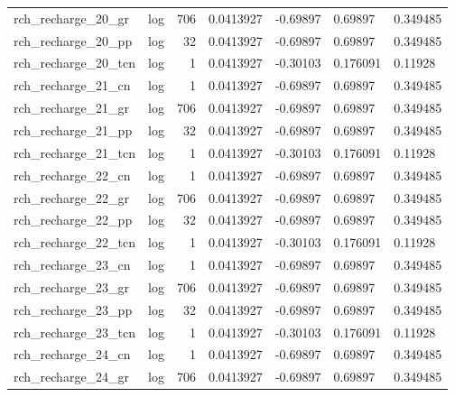 \documentclass{article}
\begin{document}
\begin{center}
\begin{landscape}
\begin{longtable}{llrllll}
 rch\_recharge\_20\_gr &       log &    706 &      0.0413927 &       -0.69897 &        0.69897 &           0.349485 \\
 rch\_recharge\_20\_pp &       log &     32 &      0.0413927 &       -0.69897 &        0.69897 &           0.349485 \\
rch\_recharge\_20\_tcn &       log &      1 &      0.0413927 &       -0.30103 &       0.176091 &            0.11928 \\
 rch\_recharge\_21\_cn &       log &      1 &      0.0413927 &       -0.69897 &        0.69897 &           0.349485 \\
 rch\_recharge\_21\_gr &       log &    706 &      0.0413927 &       -0.69897 &        0.69897 &           0.349485 \\
 rch\_recharge\_21\_pp &       log &     32 &      0.0413927 &       -0.69897 &        0.69897 &           0.349485 \\
rch\_recharge\_21\_tcn &       log &      1 &      0.0413927 &       -0.30103 &       0.176091 &            0.11928 \\
 rch\_recharge\_22\_cn &       log &      1 &      0.0413927 &       -0.69897 &        0.69897 &           0.349485 \\
 rch\_recharge\_22\_gr &       log &    706 &      0.0413927 &       -0.69897 &        0.69897 &           0.349485 \\
 rch\_recharge\_22\_pp &       log &     32 &      0.0413927 &       -0.69897 &        0.69897 &           0.349485 \\
rch\_recharge\_22\_tcn &       log &      1 &      0.0413927 &       -0.30103 &       0.176091 &            0.11928 \\
 rch\_recharge\_23\_cn &       log &      1 &      0.0413927 &       -0.69897 &        0.69897 &           0.349485 \\
 rch\_recharge\_23\_gr &       log &    706 &      0.0413927 &       -0.69897 &        0.69897 &           0.349485 \\
 rch\_recharge\_23\_pp &       log &     32 &      0.0413927 &       -0.69897 &        0.69897 &           0.349485 \\
rch\_recharge\_23\_tcn &       log &      1 &      0.0413927 &       -0.30103 &       0.176091 &            0.11928 \\
 rch\_recharge\_24\_cn &       log &      1 &      0.0413927 &       -0.69897 &        0.69897 &           0.349485 \\
 rch\_recharge\_24\_gr &       log &    706 &      0.0413927 &       -0.69897 &        0.69897 &           0.349485 \\

\end{longtable}
\end{landscape}
\end{center}
\end{document}
